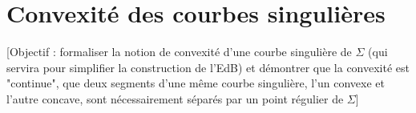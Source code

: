 \section{Convexité des courbes singulières}
\label{section:def_convexite_courbe_singuliere}
[Objectif : formaliser la notion de convexité d'une courbe singulière de $\Sigma$ (qui servira pour simplifier la construction de l'EdB) et démontrer que la convexité est "continue", \ie que deux segments d'une même courbe singulière, l'un convexe et l'autre concave, sont nécessairement séparés par un point régulier de $\Sigma$]
%



